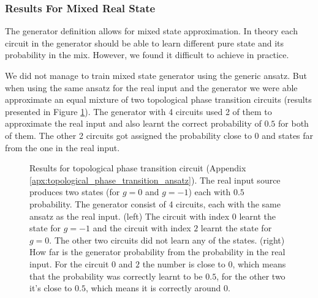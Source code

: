 \subsubsection{Results For Mixed Real State}
The generator definition allows for mixed state approximation. In theory each
circuit in the generator should be able to learn different pure state and its
probability in the mix. However, we found it difficult to achieve in practice.

We did not manage to train mixed state generator using the generic ansatz. But
when using the same ansatz for the real input and the generator we were able
approximate an equal mixture of two topological phase transition circuits (results
presented in Figure \ref{fig:wqgans_grid_phase_1}). The generator with 4 circuits
used 2 of them to approximate the real input and also learnt the correct
probability of $0.5$ for both of them. The other 2 circuits got assigned the
probability close to $0$ and states far from the one in the real input.

\begin{figure}[htbp!]
  \captionsetup[subfigure]{labelformat=empty}
  \centering
  \caption{Results for topological phase transition circuit (Appendix
    \ref{apx:topological_phase_transition_ansatz}). The real input source
    produces two states (for $g=0$ and $g=-1$) each with $0.5$ probability.
    The generator consist of 4 circuits, each with the same ansatz as the real
    input. (left) The circuit with index $0$ learnt the state for $g=-1$ and the
    circuit with index $2$ learnt the state for $g=0$. The other two circuits
    did not learn any of the states. (right) How far is the generator probability 
    from the probability in the real input. For the circuit $0$
    and $2$ the number is close to $0$, which means that the probability was
    correctly learnt to be $0.5$, for the other two it's close to $0.5$, which
    means it is correctly around $0$.
  }
  \label{fig:wqgans_grid_phase_1}
\end{figure}

